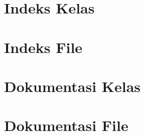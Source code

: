 \documentclass[twoside]{book}
\newcommand{\+}{\discretionary{\mbox{\scriptsize$\hookleftarrow$}}{}{}}
\newcommand{\clearemptydoublepage}{%
  \newpage{\pagestyle{empty}\cleardoublepage}%
}
\begin{document}
\chapter{Indeks Kelas}

\chapter{Indeks File}

\chapter{Dokumentasi Kelas}


\chapter{Dokumentasi File}





\backmatter
\newpage
{}
\clearemptydoublepage
{}
\printindex
\end{document}
